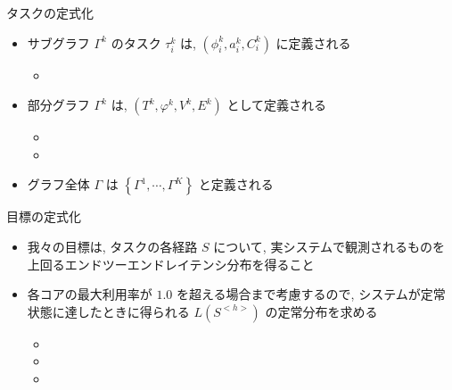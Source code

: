 \begin{frame}{タスクの定式化}
    \begin{itemize}
        \item サブグラフ $\Gamma^{k}$ のタスク $\tau_{i}^{k}$ は, $\left(\phi_{i}^{k}, a_{i}^{k}, C_{i}^{k}\right)$ に定義される
        \begin{itemize}
            \item {}
        \end{itemize}
        \item 部分グラフ $\Gamma^{k}$ は, $\left(T^{k}, \varphi^{k}, V^{k}, E^{k}\right)$ として定義される
        \begin{itemize}
            \item {}
            \item {}
        \end{itemize}
        \item グラフ全体 $\Gamma$ は $\left\{\Gamma^{1}, \cdots, \Gamma^{K}\right\}$ と定義される
    \end{itemize}
\end{frame}

\begin{frame}{目標の定式化}
    \begin{itemize}
        \item 我々の目標は, タスクの各経路 $S$ について, 実システムで観測されるものを上回るエンドツーエンドレイテンシ分布を得ること
        \item 各コアの最大利用率が $1.0$ を超える場合まで考慮するので, システムが定常状態に達したときに得られる $L\left(S^{<h>}\right)$ の定常分布を求める
        \begin{itemize}
            \item {}
            \item {}
            \item {}
        \end{itemize}
    \end{itemize}
\end{frame}
